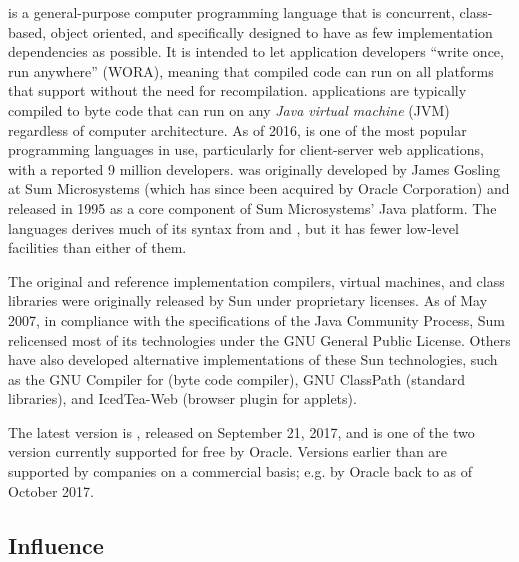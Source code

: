 \documentclass[../Languages.tex]{subfiles}
\begin{document}
\label{sec:java}

 is a general-purpose computer programming language that is
concurrent, class-based, object oriented, and specifically designed to have as
few implementation dependencies as possible. It is intended to let application
developers ``write once, run anywhere'' (WORA), meaning that compiled
 code can run on all platforms that support  without
the need for recompilation.  applications are typically compiled
to byte code that can run on any \textit{Java virtual machine} (JVM) regardless
of computer architecture. As of 2016,  is one of the most popular
programming languages in use, particularly for client-server web applications,
with a reported 9 million developers.  was originally developed by
James Gosling at Sum Microsystems (which has since been acquired by Oracle
Corporation) and released in 1995 as a core component of Sum Microsystems' Java
platform. The languages derives much of its syntax from  and
, but it has fewer low-level facilities than either of them.

The original and reference implementation  compilers, virtual
machines, and class libraries were originally released by Sun under proprietary
licenses. As of May 2007, in compliance with the specifications of the Java
Community Process, Sum relicensed most of its  technologies under
the GNU General Public License. Others have also developed alternative
implementations of these Sun technologies, such as the GNU Compiler for
 (byte code compiler), GNU ClassPath (standard libraries), and
IcedTea-Web (browser plugin for applets).

The latest version is , released on September 21, 2017, and is
one of the two version currently supported for free by Oracle. Versions earlier
than  are supported by companies on a commercial basis; e.g. by
Oracle back to  as of October 2017.

\subsection{Influence}\label{sub:influence}
\end{document}

